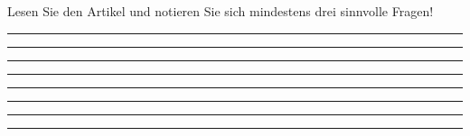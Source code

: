 \item Lesen Sie den Artikel \parencite{utilUDPaC} und notieren Sie sich
mindestens drei sinnvolle Fragen!

  \rule{0.94\textwidth}{0.5pt}

  \rule{0.94\textwidth}{0.5pt}

  \rule{0.94\textwidth}{0.5pt}

  \rule{0.94\textwidth}{0.5pt}

  \rule{0.94\textwidth}{0.5pt}

  \rule{0.94\textwidth}{0.5pt}

  \rule{0.94\textwidth}{0.5pt}

  \rule{0.94\textwidth}{0.5pt}

